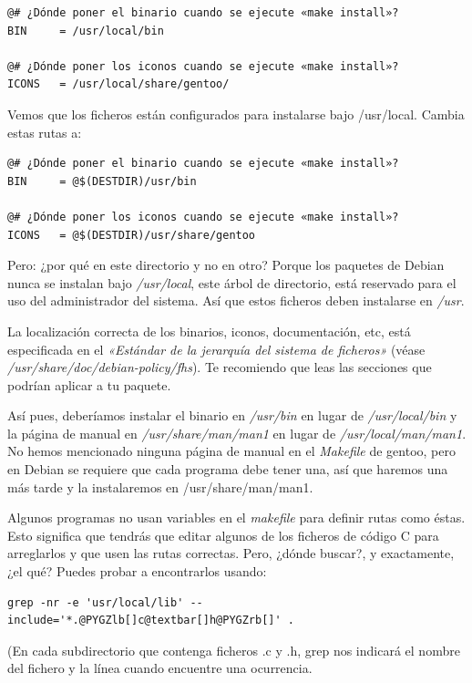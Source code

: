 \documentclass[letterpaper,12pt,spanish]{manual}
\begin{document}
\begin{Verbatim}[commandchars=@\[\]]
@# ¿Dónde poner el binario cuando se ejecute «make install»?
BIN     = /usr/local/bin

@# ¿Dónde poner los iconos cuando se ejecute «make install»?
ICONS   = /usr/local/share/gentoo/
\end{Verbatim}

Vemos que los ficheros están configurados para instalarse bajo /usr/local. Cambia estas rutas a:

\begin{Verbatim}[commandchars=@\[\]]
@# ¿Dónde poner el binario cuando se ejecute «make install»?
BIN     = @$(DESTDIR)/usr/bin

@# ¿Dónde poner los iconos cuando se ejecute «make install»?
ICONS   = @$(DESTDIR)/usr/share/gentoo
\end{Verbatim}

Pero: ¿por qué en este directorio y no en otro? Porque los paquetes de Debian nunca se instalan bajo \emph{/usr/local}, este árbol de directorio, está reservado para el uso del administrador del sistema. Así que estos ficheros deben instalarse en \emph{/usr}.

La localización correcta de los binarios, iconos, documentación, etc, está especificada en el \emph{«Estándar de la jerarquía del sistema de ficheros»} (véase \emph{/usr/share/doc/debian-policy/fhs}). Te recomiendo que leas las secciones que podrían aplicar a tu paquete.

Así pues, deberíamos instalar el binario en \emph{/usr/bin} en lugar de \emph{/usr/local/bin} y la página de manual en \emph{/usr/share/man/man1} en lugar de \emph{/usr/local/man/man1}. No hemos mencionado ninguna página de manual en el \emph{Makefile} de gentoo, pero en Debian se requiere que cada programa debe tener una, así que haremos una más tarde y la instalaremos en /usr/share/man/man1.

Algunos programas no usan variables en el \emph{makefile} para definir rutas como éstas. Esto significa que tendrás que editar algunos de los ficheros de código C para arreglarlos y que usen las rutas correctas. Pero, ¿dónde buscar?, y exactamente, ¿el qué? Puedes probar a encontrarlos usando:

\begin{Verbatim}[commandchars=@\[\]]
grep -nr -e 'usr/local/lib' --include='*.@PYGZlb[]c@textbar[]h@PYGZrb[]' .
\end{Verbatim}

(En cada subdirectorio que contenga ficheros .c y .h, grep nos indicará el nombre del fichero y la línea cuando encuentre una ocurrencia.
\end{document}
